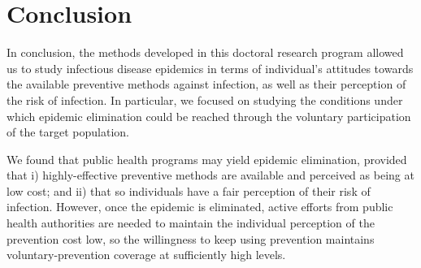 %
%

\section{Conclusion}
In conclusion, the methods developed in this doctoral research program allowed us to study infectious disease epidemics in terms of individual's attitudes towards the available preventive methods against infection, as well as their perception of the risk of infection. In particular, we focused on studying the conditions under which epidemic elimination could be reached through the voluntary participation of the target population.

We found that public health programs may yield epidemic elimination, provided that i) highly-effective preventive methods are available and perceived as being at low cost; and ii) that so individuals have a fair perception of their risk of infection. However, once the epidemic is eliminated, active efforts from public health authorities are needed to maintain the individual perception of the prevention cost low, so the willingness to keep using prevention maintains voluntary-prevention coverage at sufficiently high levels.